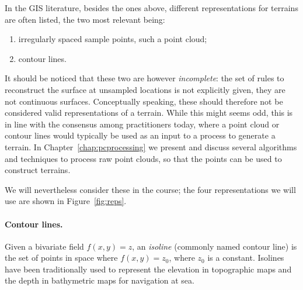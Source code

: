 In the GIS literature, besides the ones above, different representations for terrains are often listed, the two most relevant being:
\begin{enumerate}
  \item irregularly spaced sample points, such a point cloud; 
  \item contour lines.
\end{enumerate}
It should be noticed that these two are however \emph{incomplete}: the set of rules to reconstruct the surface at unsampled locations is not explicitly given, they are not continuous surfaces.
Conceptually speaking, these should therefore not be considered valid representations of a terrain.
While this might seems odd, this is in line with the consensus among practitioners today, where a point cloud or contour lines would typically be used as an input to a process to generate a terrain.
In Chapter~\ref{chap:pcprocessing} we present and discuss several algorithms and techniques to process raw point clouds, so that the points can be used to construct terrains.

We will nevertheless consider these in the course; the four representations we will use are shown in Figure~\ref{fig:reps}.

%

\paragraph{Contour lines.}%

Given a bivariate field $f(x,y) = z$, an \emph{isoline} (commonly named contour line) is the set of points in space where $f(x,y) = z_0$, where $z_0$ is a constant. 
Isolines have been traditionally used to represent the elevation in topographic maps and the depth in bathymetric maps for navigation at sea. 

%


